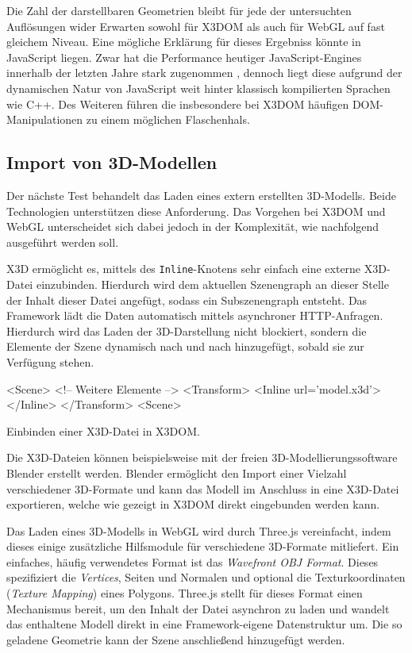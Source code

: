 Die Zahl der darstellbaren Geometrien bleibt für jede der untersuchten Auflösungen wider Erwarten sowohl für X3DOM als auch für WebGL auf fast gleichem Niveau. Eine mögliche Erklärung für dieses Ergebniss könnte in JavaScript liegen. Zwar hat die Performance heutiger JavaScript-Engines innerhalb der letzten Jahre stark zugenommen \autocite{Evans201443}, dennoch liegt diese aufgrund der dynamischen Natur von JavaScript weit hinter klassisch kompilierten Sprachen wie C++. Des Weiteren führen die insbesondere bei X3DOM häufigen DOM-Manipulationen zu einem möglichen Flaschenhals.

\subsection{Import von 3D-Modellen}

Der nächste Test behandelt das Laden eines extern erstellten 3D-Modells. Beide Technologien unterstützen diese Anforderung. Das Vorgehen bei X3DOM und WebGL unterscheidet sich dabei jedoch in der Komplexität, wie nachfolgend ausgeführt werden soll.

X3D ermöglicht es, mittels des \texttt{Inline}-Knotens sehr einfach eine externe X3D-Datei einzubinden. Hierdurch wird dem aktuellen Szenengraph an dieser Stelle der Inhalt dieser Datei angefügt, sodass ein Subszenengraph entsteht. Das Framework lädt die Daten automatisch mittels asynchroner HTTP-Anfragen. Hierdurch wird das Laden der 3D-Darstellung nicht blockiert, sondern die Elemente der Szene dynamisch nach und nach hinzugefügt, sobald sie zur Verfügung stehen.

\smallskip
\begin{listing}[ht]
\begin{htmlcode}
<Scene>
	<!-- Weitere Elemente -->
	<Transform>
          <Inline url='model.x3d'></Inline>
    </Transform>
<Scene>
\end{htmlcode}
\caption{Einbinden einer X3D-Datei in X3DOM.}
\label{LISTING:X3DOM_INLINE_NODE}
\end{listing}

Die X3D-Dateien können beispielsweise mit der freien 3D-Modellierungssoftware Blender \autocite{SOFTWARE_BLENDER} erstellt werden. Blender ermöglicht den Import einer Vielzahl verschiedener 3D-Formate und kann das Modell im Anschluss in eine X3D-Datei exportieren, welche wie gezeigt in X3DOM direkt eingebunden werden kann.

Das Laden eines 3D-Modells in WebGL wird durch Three.js vereinfacht, indem dieses einige zusätzliche Hilfsmodule für verschiedene 3D-Formate mitliefert. Ein einfaches, häufig verwendetes Format ist das \emph{Wavefront OBJ Format}. Dieses spezifiziert die \emph{Vertices}, Seiten und Normalen und optional die Texturkoordinaten (\emph{Texture Mapping}) eines Polygons.
Three.js stellt für dieses Format einen Mechanismus bereit, um den Inhalt der Datei asynchron zu laden und wandelt das enthaltene Modell direkt in eine Framework-eigene Datenstruktur um. Die so geladene Geometrie kann der Szene anschließend hinzugefügt werden.

